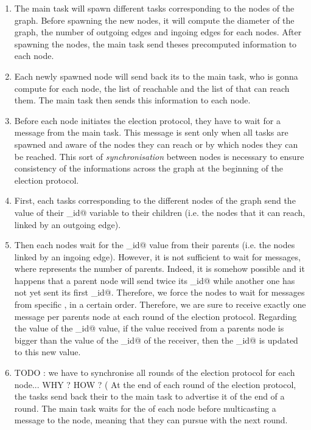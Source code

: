 \documentclass{article}
\begin{document}
\begin{enumerate}
\item The main task will spawn different \verb@pvm@ tasks corresponding to the nodes of the graph. Before spawning the new nodes, it will compute the diameter of the graph, the number of outgoing edges and ingoing edges for each nodes. After spawning the nodes, the main task send theses precomputed information to each node.
\item Each newly spawned node will send back its \verb@tid@ to the main task, who is gonna compute for each node, the list of reachable \verb@tids@ and the list of \verb@tids@ that can reach them. The main task then sends this information to each node.
\item Before each node initiates the election protocol, they have to wait for a \verb@start@ message from the main task. This message is sent only when all tasks are spawned and aware of the nodes they can reach or by which nodes they can be reached. This sort of \textit{synchronisation} between nodes is necessary to ensure consistency of the informations across the graph at the beginning of the election protocol.
\item First, each \verb@pvm@ tasks corresponding to the different nodes of the graph send the value of their \verb@max_id@ variable to their children (i.e. the nodes that it can reach, linked by an outgoing edge).
\item Then each nodes wait for the \verb@max_id@ value from their parents (i.e. the nodes linked by an ingoing edge). However, it is not sufficient to wait for \verb@n@ messages, where \verb@n@ represents the number of parents. Indeed, it is somehow possible and it happens that a parent node will send twice its \verb@max_id@ while another one has not yet sent its first \verb@max_id@. Therefore, we force the nodes to wait for messages from specific \verb@tid@, in a certain order. Therefore, we are sure to receive exactly one message per parents node at each round of the election protocol. Regarding the value of the \verb@max_id@ value, if the value received from a parents node is bigger than the value of the \verb@max_id@ of the receiver, then the \verb@max_id@ is updated to this new value.
\item TODO : we have to synchronise all rounds of the election protocol for each node... WHY ? HOW ? ( At the end of each round of the election protocol, the \verb@pvm@ tasks send back their \verb@tid@ to the main task to advertise it of the end of a round. The main task waits for the \verb@tid@ of each node before multicasting a \verb@go@ message to the node, meaning that they can pursue with the next round.
\end{enumerate}
\end{document}
